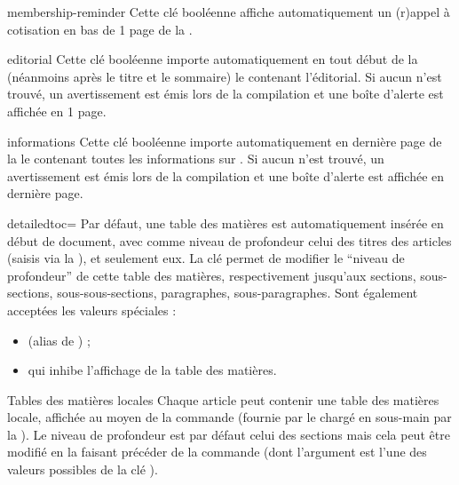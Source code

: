 \documentclass{letgut}
\begin{document}
\begin{docKey}{membership-reminder}{}{}
  Cette clé booléenne affiche automatiquement un (r)appel à cotisation en bas de
  1\iere{} page de la .
\end{docKey}

\begin{docKey}{editorial}{}{}
  Cette clé booléenne importe automatiquement en tout début de la 
  (néanmoins après le titre et le sommaire) le  contenant
  l'éditorial. Si aucun  n'est trouvé, un avertissement est
  émis lors de la compilation et une boîte d'alerte est affichée en 1\iere{}
  page.
\end{docKey}

\begin{docKey}{informations}{}{}
  Cette clé booléenne importe automatiquement en dernière page de la 
  le  contenant toutes les informations sur
  \gut{}. Si aucun  n'est trouvé, un avertissement
  est émis lors de la compilation et une boîte d'alerte est affichée en dernière
  page.
\end{docKey}

%
\begin{docKey}[][doc updated={2023-01-19}]{detailedtoc}{=\textbar{}\textbar{}\textbar{}\textbar{}}{}
  Par défaut, une table des matières est automatiquement insérée en début de
  document, avec comme niveau de profondeur celui des titres des articles
  (saisis via la ), et seulement eux.  La clé 
  permet de modifier le \enquote{niveau de profondeur} de cette table des
  matières, respectivement jusqu'aux sections, sous-sections,
  sous-sous-sections, paragraphes, sous-paragraphes. Sont également acceptées
  les valeurs spéciales :
  \begin{itemize}
  \item {} (alias de ) ;
  \item {} qui inhibe l'affichage de la table des matières.
  \end{itemize}

  \begin{dbremark}{Tables des matières locales}{}
    Chaque article peut contenir une table des matières locale, affichée au
    moyen de la commande  (fournie par le
     chargé en sous-main par la ). Le niveau de
    profondeur est par défaut celui des sections mais cela peut être modifié en
    la faisant précéder de la commande  (dont
    l'argument est l'une des valeurs possibles de la clé ).
  \end{dbremark}
\end{docKey}
\end{document}
